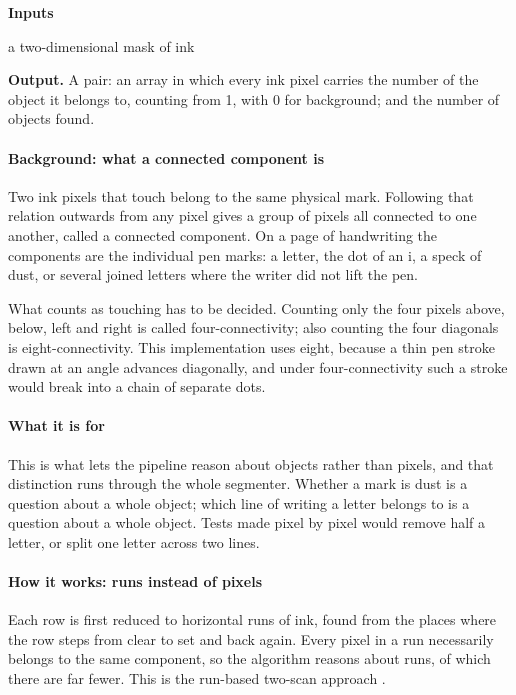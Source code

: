 \noindent\textbf{Inputs}
\begin{description}[leftmargin=2.2em,style=nextline,font=\normalfont\ttfamily]\setlength\itemsep{1pt}
  \item[{mask}] \normalfont a two-dimensional mask of ink
\end{description}

\noindent\textbf{Output.} A pair: an array in which every ink pixel carries the number of the object it belongs to, counting from 1, with 0 for background; and the number of objects found.


\paragraph{Background: what a connected component is}
Two ink pixels that touch belong to the same physical mark. Following that relation outwards from any pixel gives a group of pixels all connected to one another, called a connected component. On a page of handwriting the components are the individual pen marks: a letter, the dot of an i, a speck of dust, or several joined letters where the writer did not lift the pen.

What counts as touching has to be decided. Counting only the four pixels above, below, left and right is called four-connectivity; also counting the four diagonals is eight-connectivity. This implementation uses eight, because a thin pen stroke drawn at an angle advances diagonally, and under four-connectivity such a stroke would break into a chain of separate dots.


\paragraph{What it is for}
This is what lets the pipeline reason about objects rather than pixels, and that distinction runs through the whole segmenter. Whether a mark is dust is a question about a whole object; which line of writing a letter belongs to is a question about a whole object. Tests made pixel by pixel would remove half a letter, or split one letter across two lines.


\paragraph{How it works: runs instead of pixels}
Each row is first reduced to horizontal runs of ink, found from the places where the row steps from clear to set and back again. Every pixel in a run necessarily belongs to the same component, so the algorithm reasons about runs, of which there are far fewer. This is the run-based two-scan approach \cite{he2008}.


